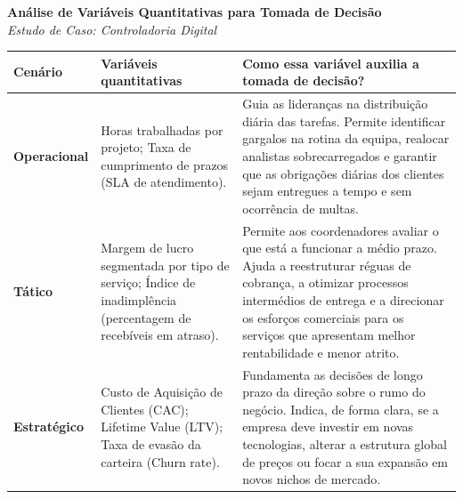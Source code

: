 \documentclass[11pt, a4paper]{article}
\begin{document}
\begin{center}
    \Large \textbf{Análise de Variáveis Quantitativas para Tomada de Decisão} \\
    \vspace{0.2cm}
    \large \textit{Estudo de Caso: Controladoria Digital}
\end{center}
\vspace{1cm}

\renewcommand{\arraystretch}{1.8} %
\noindent
\begin{tabularx}{\textwidth}{@{} l >{\raggedright\arraybackslash}X >{\raggedright\arraybackslash}X @{}}
\toprule
\textbf{Cenário} & \textbf{Variáveis quantitativas} & \textbf{Como essa variável auxilia a tomada de decisão?} \\
\midrule
\textbf{Operacional} & 
Horas trabalhadas por projeto; Taxa de cumprimento de prazos (SLA de atendimento). & 
Guia as lideranças na distribuição diária das tarefas. Permite identificar gargalos na rotina da equipa, realocar analistas sobrecarregados e garantir que as obrigações diárias dos clientes sejam entregues a tempo e sem ocorrência de multas. \\
\midrule
\textbf{Tático} & 
Margem de lucro segmentada por tipo de serviço; Índice de inadimplência (percentagem de recebíveis em atraso). & 
Permite aos coordenadores avaliar o que está a funcionar a médio prazo. Ajuda a reestruturar réguas de cobrança, a otimizar processos intermédios de entrega e a direcionar os esforços comerciais para os serviços que apresentam melhor rentabilidade e menor atrito. \\
\midrule
\textbf{Estratégico} & 
Custo de Aquisição de Clientes (CAC); Lifetime Value (LTV); Taxa de evasão da carteira (Churn rate). & 
Fundamenta as decisões de longo prazo da direção sobre o rumo do negócio. Indica, de forma clara, se a empresa deve investir em novas tecnologias, alterar a estrutura global de preços ou focar a sua expansão em novos nichos de mercado. \\
\bottomrule
\end{tabularx}
\end{document}
